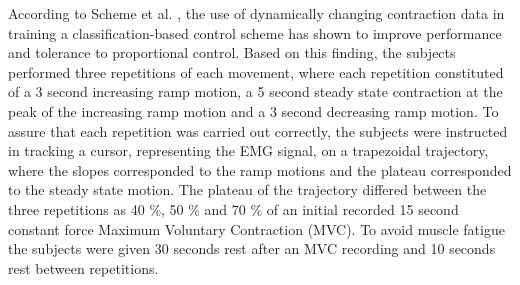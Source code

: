 According to Scheme et al. \cite{Scheme2015}, the use of dynamically changing contraction data in training a classification-based control scheme has shown to improve performance and tolerance to proportional control. Based on this finding, the subjects performed three repetitions of each movement, where each repetition constituted of a 3 second increasing ramp motion, a 5 second steady state contraction at the peak of the increasing ramp motion and a 3 second decreasing ramp motion. To assure that each repetition was carried out correctly, the subjects were instructed in tracking a cursor, representing the EMG signal, on a trapezoidal trajectory, where the slopes corresponded to the ramp motions and the plateau corresponded to the steady state motion. The plateau of the trajectory differed between the three repetitions as 40 \%, 50 \% and 70 \% of an initial recorded 15 second constant force Maximum Voluntary Contraction (MVC). To avoid muscle fatigue the subjects were given 30 seconds rest after an MVC recording and 10 seconds rest between repetitions. 